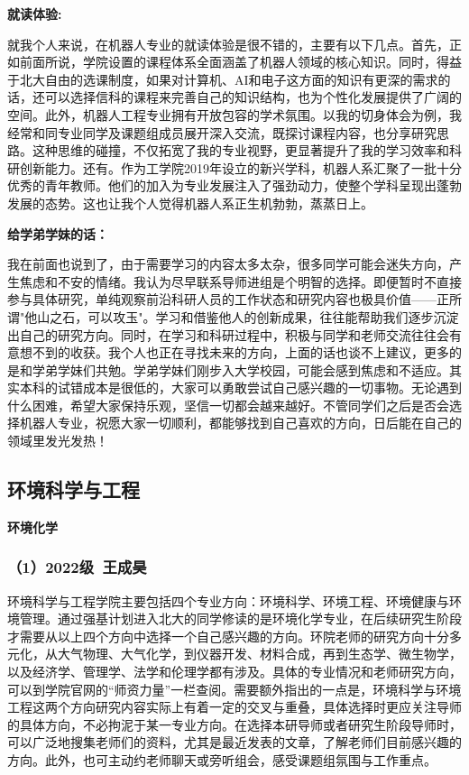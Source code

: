 \documentclass[11pt,oneside]{book}
\begin{document}
\vspace{10pt}

\textbf{就读体验:}

就我个人来说，在机器人专业的就读体验是很不错的，主要有以下几点。首先，正如前面所说，学院设置的课程体系全面涵盖了机器人领域的核心知识。同时，得益于北大自由的选课制度，如果对计算机、AI和电子这方面的知识有更深的需求的话，还可以选择信科的课程来完善自己的知识结构，也为个性化发展提供了广阔的空间。此外，机器人工程专业拥有开放包容的学术氛围。以我的切身体会为例，我经常和同专业同学及课题组成员展开深入交流，既探讨课程内容，也分享研究思路。这种思维的碰撞，不仅拓宽了我的专业视野，更显著提升了我的学习效率和科研创新能力。还有。作为工学院2019年设立的新兴学科，机器人系汇聚了一批十分优秀的青年教师。他们的加入为专业发展注入了强劲动力，使整个学科呈现出蓬勃发展的态势。这也让我个人觉得机器人系正生机勃勃，蒸蒸日上。

\vspace{10pt}

\textbf{给学弟学妹的话：}

我在前面也说到了，由于需要学习的内容太多太杂，很多同学可能会迷失方向，产生焦虑和不安的情绪。我认为尽早联系导师进组是个明智的选择。即便暂时不直接参与具体研究，单纯观察前沿科研人员的工作状态和研究内容也极具价值——正所谓"他山之石，可以攻玉"。学习和借鉴他人的创新成果，往往能帮助我们逐步沉淀出自己的研究方向。同时，在学习和科研过程中，积极与同学和老师交流往往会有意想不到的收获。我个人也正在寻找未来的方向，上面的话也谈不上建议，更多的是和学弟学妹们共勉。学弟学妹们刚步入大学校园，可能会感到焦虑和不适应。其实本科的试错成本是很低的，大家可以勇敢尝试自己感兴趣的一切事物。无论遇到什么困难，希望大家保持乐观，坚信一切都会越来越好。不管同学们之后是否会选择机器人专业，祝愿大家一切顺利，都能够找到自己喜欢的方向，日后能在自己的领域里发光发热！

\subsection{环境科学与工程}

\vspace{10pt}

\textbf{环境化学}


\subsubsection{（1）2022级\ 王成昊}

环境科学与工程学院主要包括四个专业方向：环境科学、环境工程、环境健康与环境管理。通过强基计划进入北大的同学修读的是环境化学专业，在后续研究生阶段才需要从以上四个方向中选择一个自己感兴趣的方向。环院老师的研究方向十分多元化，从大气物理、大气化学，到仪器开发、材料合成，再到生态学、微生物学，以及经济学、管理学、法学和伦理学都有涉及。具体的专业情况和老师研究方向，可以到学院官网的“师资力量”一栏查阅。需要额外指出的一点是，环境科学与环境工程这两个方向研究内容实际上有着一定的交叉与重叠，具体选择时更应关注导师的具体方向，不必拘泥于某一专业方向。在选择本研导师或者研究生阶段导师时，可以广泛地搜集老师们的资料，尤其是最近发表的文章，了解老师们目前感兴趣的方向。此外，也可主动约老师聊天或旁听组会，感受课题组氛围与工作重点。
\end{document}
